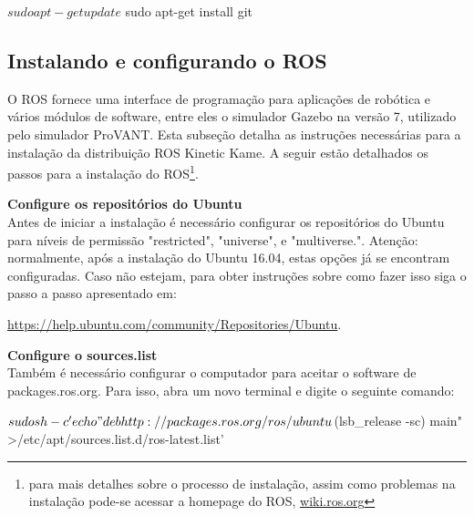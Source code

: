 
\begin{bashcode}
$ sudo apt-get update
$ sudo apt-get install git
\end{bashcode}

\subsection{Instalando e configurando o ROS}

O ROS fornece uma interface de programação para aplicações de robótica e vários módulos de software, entre eles o simulador Gazebo na versão 7, utilizado pelo simulador ProVANT. Esta subseção detalha as instruções necessárias para a instalação da distribuição ROS Kinetic Kame.  A seguir estão detalhados os passos para a instalação do ROS\footnote{para mais detalhes sobre o processo de instalação, assim como problemas na instalação pode-se acessar a homepage do ROS, \url{wiki.ros.org}}.\\
\bigskip
\bigskip
\bigskip

\textbf{Configure os repositórios do Ubuntu} \\

Antes de iniciar a instalação é necessário configurar os repositórios do Ubuntu para níveis de permissão "restricted", "universe", e "multiverse.". Atenção: normalmente, após a instalação do Ubuntu 16.04, estas opções já se encontram configuradas. Caso não estejam, para obter instruções sobre como fazer isso siga o passo a passo apresentado em:
\begin{center}
\url{https://help.ubuntu.com/community/Repositories/Ubuntu}.
\end{center}

\textbf{Configure o sources.list} \\

Também é necessário configurar o computador para aceitar o software de packages.ros.org. Para isso, abra um novo terminal e digite o seguinte comando:

\begin{bashcode}
$ sudo sh -c 'echo "deb http://packages.ros.org/ros/ubuntu $(lsb_release -sc) main"
 >/etc/apt/sources.list.d/ros-latest.list'
\end{bashcode}

